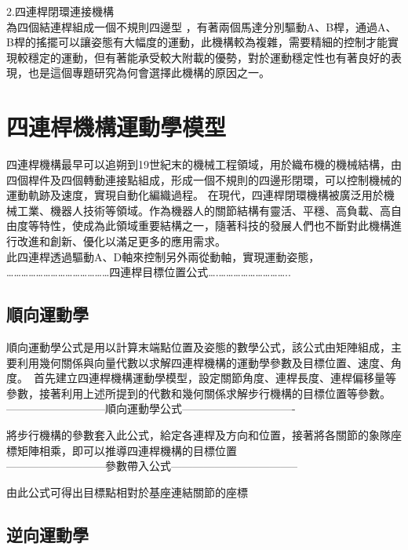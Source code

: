 2.四連桿閉環連接機構\\
為四個結連桿組成一個不規則四邊型 ，有著兩個馬達分別驅動A、B桿，通過A、B桿的搖擺可以讓姿態有大幅度的運動，此機構較為複雜，需要精細的控制才能實現較穩定的運動，但有著能承受較大附載的優勢，對於運動穩定性也有著良好的表現，也是這個專題研究為何會選擇此機構的原因之一。\\

\section{四連桿機構運動學模型}

四連桿機構最早可以追朔到19世紀末的機械工程領域，用於織布機的機械結構，由四個桿件及四個轉動連接點組成，形成一個不規則的四邊形閉環，可以控制機械的運動軌跡及速度，實現自動化編織過程。
在現代，四連桿閉環機構被廣泛用於機械工業、機器人技術等領域。作為機器人的關節結構有靈活、平穩、高負載、高自由度等特性，使成為此領域重要結構之一，隨著科技的發展人們也不斷對此機構進行改進和創新、優化以滿足更多的應用需求。\\
 此四連桿透過驅動A、D軸來控制另外兩從動軸，實現運動姿態，\\

……………………………………四連桿目標位置公式….………………………..

\subsection{順向運動學}
順向運動學公式是用以計算末端點位置及姿態的數學公式，該公式由矩陣組成，主要利用幾何關係與向量代數以求解四連桿機構的運動學參數及目標位置、速度、角度。\
首先建立四連桿機構運動學模型，設定關節角度、連桿長度、連桿偏移量等參數，接著利用上述所提到的代數和幾何關係求解步行機構的目標位置等參數。\\

---------------------------順向運動學公式-------------------------------


將步行機構的參數套入此公式，給定各連桿及方向和位置，接著將各關節的象隊座標矩陣相乘，即可以推導四連桿機構的目標位置\\

---------------------------參數帶入公式-----------------------------------


由此公式可得出目標點相對於基座連結關節的座標\\

\subsection{逆向運動學}


